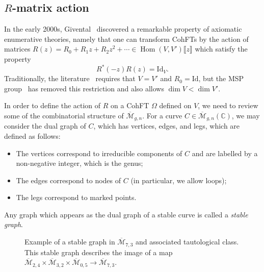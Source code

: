 \documentclass[10pt]{amsart}
\theoremstyle{definition}
\theoremstyle{remark}
\theoremstyle{plain}
\theoremstyle{definition}
\theoremstyle{remark}
\newcommand{\C}{\mathbb{C}}
\newcommand{\Mbar}{\overline{\mathcal{M}}}
\newcommand{\mc}[1]{\mathcal{#1}}
\newcommand{\mr}[1]{\mathrm{#1}}
\newcommand{\ol}[1]{\overline{#1}}
\newcommand{\1}{\mathbf{1}}
\newcommand{\2}{\mathbf{2}}
\newcommand{\3}{\mathbf{3}}
\newcommand{\ps}[1]{\llbracket #1 \rrbracket}
\DeclareMathOperator{\Hom}{Hom}
\begin{document}
\subsection{$R$-matrix action}%
\label{sub:R-matrix action}

In the early 2000s, Givental~\cite{virasorofanotoric,symplfrob} discovered a remarkable property of axiomatic enumerative theories, namely that one can transform CohFTs by the action of matrices $R(z) = R_0 + R_1 z + R_2 z^2 + \cdots \in \Hom(V, V')\ps{z}$ which satisfy the property
\[ R^*(-z) R(z) = \mr{Id}_V. \]
Traditionally, the literature~\cite{relationsvia3spin} requires that $V = V'$ and $R_0 = \mr{Id}$, but the MSP group~\cite{nmsp3} has removed this restriction and also allows $\dim V < \dim V'$.

In order to define the action of $R$ on a CohFT $\Omega$ defined on $V$, we need to review some of the combinatorial structure of $\Mbar_{g,n}$. For a curve $C\in \Mbar_{g,n}(\C)$, we may consider the dual graph of $C$, which has vertices, edges, and legs, which are defined as follows:
\begin{itemize}
    \item The vertices correspond to irreducible components of $C$ and are labelled by a non-negative integer, which is the genus;
    \item The edges correspond to nodes of $C$ (in particular, we allow loops);
    \item The legs correspond to marked points.
\end{itemize}
Any graph which appears as the dual graph of a stable curve is called a \textit{stable graph}.

\begin{figure}[htpb]
  \centering
  \caption{Example of a stable graph in $\ol{\mc{M}}_{7,3}$ and associated tautological class. This stable graph describes the image of a map
    $\ol{\mc{M}}_{2,4} \times \ol{\mc{M}}_{3,2} \times \ol{\mc{M}}_{0,5} \to \ol{\mc{M}}_{7,3}$.}
  \label{fig:stablegraph}
\end{figure}
\end{document}
